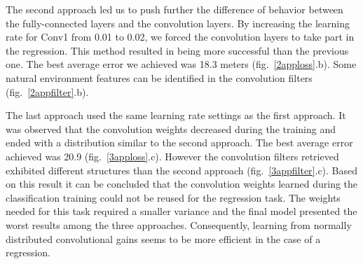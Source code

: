 The second approach led us to push further the difference of behavior between the fully-connected layers and the convolution layers. By increasing the learning rate for Conv1 from 0.01 to 0.02, we forced the convolution layers to take part in the regression. This method resulted in being more successful than the previous one. The best average error we achieved was 18.3 meters (fig.~\ref{2apploss}.b). Some natural environment features can be identified in the convolution filters (fig.~\ref{2appfilter}.b).

The last approach used the same learning rate settings as the first approach. It was observed that the convolution weights decreased during the training and ended with a distribution similar to the second approach. The best average error achieved was 20.9 (fig.~\ref{3apploss}.c). However the convolution filters retrieved exhibited different structures than the second approach (fig.~\ref{3appfilter}.c). Based on this result it can be concluded that the convolution weights learned during the classification training could not be reused for the regression task. The weights needed for this task required a smaller variance and the final model presented the worst results among the three approaches. Consequently, learning from normally distributed convolutional gains seems to be more efficient in the case of a regression.

